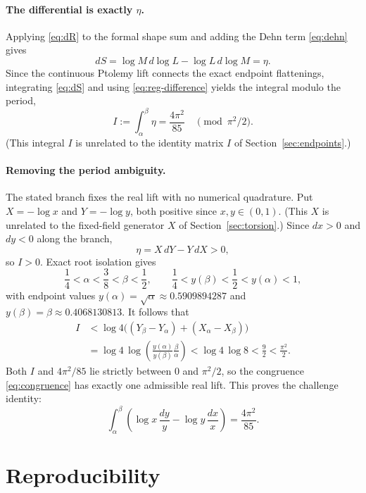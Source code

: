 \documentclass[11pt]{article}
\theoremstyle{definition}
\begin{document}
\paragraph{The differential is exactly $\eta$.}
Applying \eqref{eq:dR} to the formal shape sum and adding the Dehn term
\eqref{eq:dehn} gives
\begin{equation}\label{eq:dS}
 dS=\log M\,d\log L-\log L\,d\log M=\eta.
\end{equation}
Since the continuous Ptolemy lift connects the exact endpoint flattenings,
integrating \eqref{eq:dS} and using \eqref{eq:reg-difference} yields the integral
modulo the period,
\begin{equation}\label{eq:congruence}
 I:=\int_\alpha^\beta\eta=\frac{4\pi^2}{85}
 \quad\pmod{\pi^2/2}.
\end{equation}
(This integral $I$ is unrelated to the identity matrix $I$ of
Section~\ref{sec:endpoints}.)

\paragraph{Removing the period ambiguity.}
The stated branch fixes the real lift with no numerical quadrature.  Put
$X=-\log x$ and $Y=-\log y$, both positive since $x,y\in(0,1)$.  (This $X$ is
unrelated to the fixed-field generator $X$ of Section~\ref{sec:torsion}.)  Since
$dx>0$ and $dy<0$ along the branch,
\[
 \eta=X\,dY-Y\,dX>0,
\]
so $I>0$.  Exact root isolation gives
\[
 \frac14<\alpha<\frac38<\beta<\frac12,
 \qquad
 \frac14<y(\beta)<\frac12<y(\alpha)<1,
\]
with endpoint values $y(\alpha)=\sqrt\alpha\approx0.5909894287$ and
$y(\beta)=\beta\approx0.4068130813$.  It follows that
\begin{align*}
 I
 &<\log4\bigl((Y_\beta-Y_\alpha)+(X_\alpha-X_\beta)\bigr)\\
 &=\log4\,\log\!\left(
 \frac{y(\alpha)}{y(\beta)}\frac{\beta}{\alpha}
 \right)
 <\log4\,\log8<\frac92<\frac{\pi^2}{2}.
\end{align*}
Both $I$ and $4\pi^2/85$ lie strictly between $0$ and $\pi^2/2$, so the
congruence \eqref{eq:congruence} has exactly one admissible real lift.  This
proves the challenge identity:
\[
 \boxed{\displaystyle
 \int_{\alpha}^{\beta}
 \left(\log x\,\frac{dy}{y}-\log y\,\frac{dx}{x}\right)
 =\frac{4\pi^2}{85}.}
\]

\section{Reproducibility}\label{sec:repro}
\end{document}
